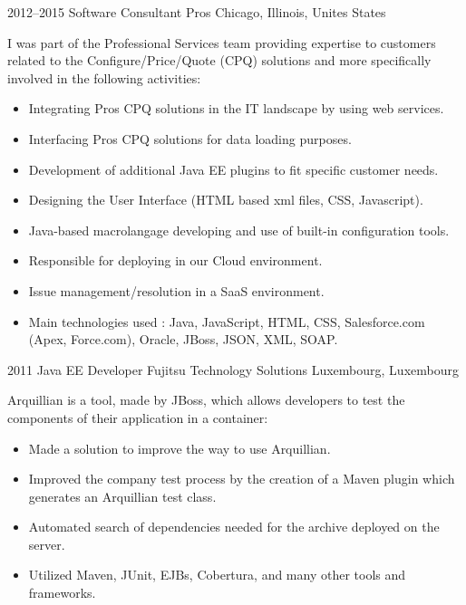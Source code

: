 \documentclass[]{friggeri-cv} %
\begin{document}
\begin{entrylist}

\entry
{2012--2015}
{Software Consultant} 
{Pros}
{Chicago, Illinois, Unites States}
{I was part of the Professional Services team providing expertise to customers related to the
Configure/Price/Quote (CPQ) solutions and more specifically involved in the following activities:\\

\vspace{-4mm}
\begin{itemize}
	\item Integrating Pros CPQ solutions in the IT landscape by using web services.
	\item Interfacing Pros CPQ solutions for data loading purposes.
	\item Development of additional Java EE plugins to fit specific customer needs.
    \item Designing the User Interface (HTML based xml files, CSS, Javascript).
    \item Java-based macrolangage developing and use of built-in configuration tools.
    \item Responsible for deploying in our Cloud environment.
    \item Issue management/resolution in a SaaS environment.
    \item Main technologies used : Java, JavaScript, HTML, CSS, Salesforce.com (Apex, Force.com),
Oracle, JBoss, JSON, XML, SOAP.
\end{itemize}}
\vspace{-7mm}

\end{entrylist}


\begin{entrylist}

\entry
{2011}
{Java EE Developer} 
{Fujitsu Technology Solutions}
{Luxembourg, Luxembourg}
{Arquillian is a tool, made by JBoss, which allows developers to test the components of their
application in a container:\\

\vspace{-4mm}
\begin{itemize}
	\item Made a solution to improve the way to use Arquillian.
	\item Improved the company test process by the creation of a Maven plugin which generates an Arquillian test class.
	\item Automated search of dependencies needed for the archive deployed on the server.
    \item Utilized Maven, JUnit, EJBs, Cobertura, and many other tools and frameworks.
\end{itemize}}
\vspace{-7mm}

\end{entrylist}
\end{document}
